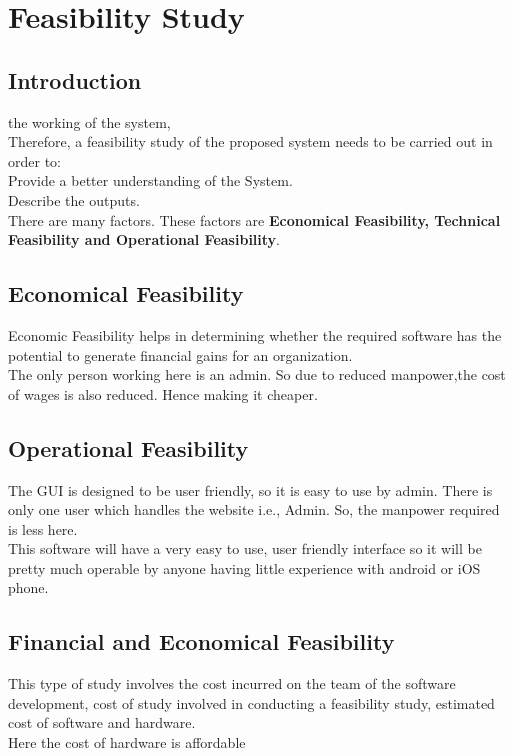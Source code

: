 \chapter{Feasibility Study}


\section{Introduction}
the working of the system, \\
Therefore, a feasibility study of the proposed system needs to be carried out in order to:\\
\textbullet \hspace{0.2cm} 	Provide a better understanding of the System.\\
\textbullet \hspace{0.2cm}	Describe the outputs.\\

There are many factors. These factors are \textbf{Economical Feasibility, Technical Feasibility and Operational Feasibility}.\\



\section{Economical Feasibility}
\textbullet \hspace{0.2cm}Economic Feasibility helps in determining whether the required software has the potential to generate financial gains for an organization.\\
\textbullet \hspace{0.2cm}The only person working here is an admin. So due to reduced manpower,the cost of wages is also reduced. Hence making it cheaper.\\

\section{Operational Feasibility}
\textbullet \hspace{0.2cm}The GUI is designed to be user friendly, so it is easy to use by admin. There is only one user which handles the website i.e., Admin. So, the manpower required is less here.\\
\textbullet \hspace{0.2cm}This software will have a very easy to use, user friendly interface so it will be pretty much operable by anyone having little experience with android or iOS phone.\\
\section{Financial and Economical Feasibility}
\textbullet \hspace{0.2cm}This type of study involves the cost incurred on the team of the software development, cost of study involved in conducting a feasibility study,
estimated cost of software and hardware.\\
\textbullet \hspace{0.2cm}Here the cost of hardware is affordable
